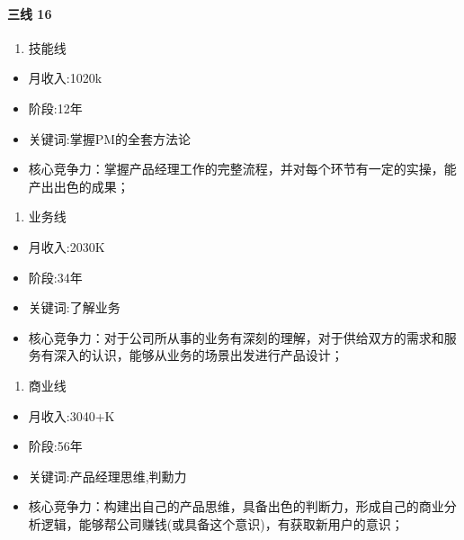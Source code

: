 \documentclass[letterpaper,11pt,english]{sphinxmanual}
\begin{document}
\paragraph{三线 16\sphinxfootnotemark[598]}
\label{\detokenize{chapter_experience/career_path:id5}}%
\begin{footnotetext}[598]\sphinxAtStartFootnote
{}
%
\end{footnotetext}\ignorespaces \begin{enumerate}
%
\item {} 
技能线

\end{enumerate}
\begin{itemize}
\item {} 
月收入:10\sphinxhyphen{}20k

\item {} 
阶段:1\sphinxhyphen{}2年

\item {} 
关键词:掌握PM的全套方法论

\item {} 
核心竞争力：掌握产品经理工作的完整流程，并对每个环节有一定的实操，能产出出色的成果；

\end{itemize}
\begin{enumerate}
%
\setcounter{enumi}{1}
\item {} 
业务线

\end{enumerate}
\begin{itemize}
\item {} 
月收入:20\sphinxhyphen{}30K

\item {} 
阶段:3\sphinxhyphen{}4年

\item {} 
关键词:了解业务

\item {} 
核心竞争力：对于公司所从事的业务有深刻的理解，对于供给双方的需求和服务有深入的认识，能够从业务的场景出发进行产品设计；

\end{itemize}
\begin{enumerate}
%
\setcounter{enumi}{2}
\item {} 
商业线

\end{enumerate}
\begin{itemize}
\item {} 
月收入:30\sphinxhyphen{}40+K

\item {} 
阶段:5\sphinxhyphen{}6年

\item {} 
关键词:产品经理思维,判勳力

\item {} 
核心竞争力：构建出自己的产品思维，具备出色的判断力，形成自己的商业分析逻辑，能够帮公司赚钱(或具备这个意识)，有获取新用户的意识；

\end{itemize}
\end{document}
